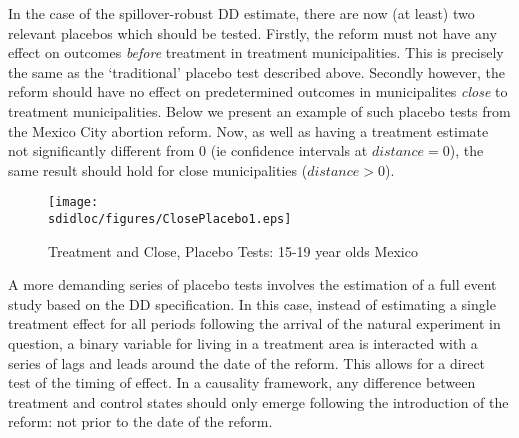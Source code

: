 In the case of the spillover-robust DD estimate, there are now (at least) two
relevant placebos which should be tested.  Firstly, the reform must not have any
effect on outcomes \emph{before} treatment in treatment municipalities.  This is
precisely the same as the `traditional' placebo test described above.  Secondly
however, the reform should have no effect on predetermined outcomes in 
municipalites \emph{close} to treatment municipalities.  Below we present an 
example of such placebo tests from the Mexico City abortion reform.  Now, as well
as having a treatment estimate not significantly different from 0 (ie confidence 
intervals at $distance=0$), the same result should hold for close municipalities 
($distance>0$).
\begin{figure}[h!]
\texttt{[image: \\sdidloc/figures/ClosePlacebo1.eps]}
\caption{Treatment and Close, Placebo Tests: 15-19 year olds Mexico}
\label{SFig:MexClose}
\vspace{2mm}
\end{figure}

A more demanding series of placebo tests involves the estimation of a full event
study based on the DD specification. In this case, instead of estimating a single
treatment effect for all periods following the arrival of the natural experiment
in question, a binary variable for living in a treatment area is interacted with 
a series of lags and leads around the date of the reform.  This allows for a 
direct test of the timing of effect. In a \citet{Granger1969} causality 
framework, any difference between treatment and control states should only emerge 
following the introduction of the reform: not prior to the date of the reform.  

